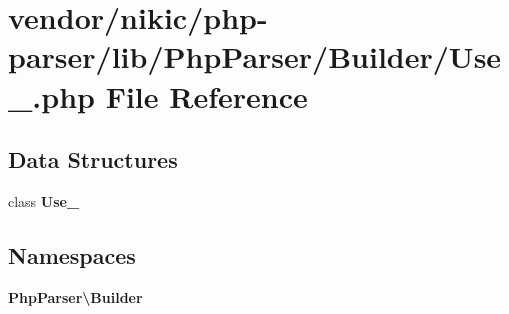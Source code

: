 \section{vendor/nikic/php-\/parser/lib/\+Php\+Parser/\+Builder/\+Use\+\_\+.php File Reference}
\label{_builder_2_use___8php}
\subsection*{Data Structures}
\begin{DoxyCompactItemize}
\item 
class {\bf Use\+\_\+}
\end{DoxyCompactItemize}
\subsection*{Namespaces}
\begin{DoxyCompactItemize}
\item 
 {\bf Php\+Parser\textbackslash{}\+Builder}
\end{DoxyCompactItemize}
